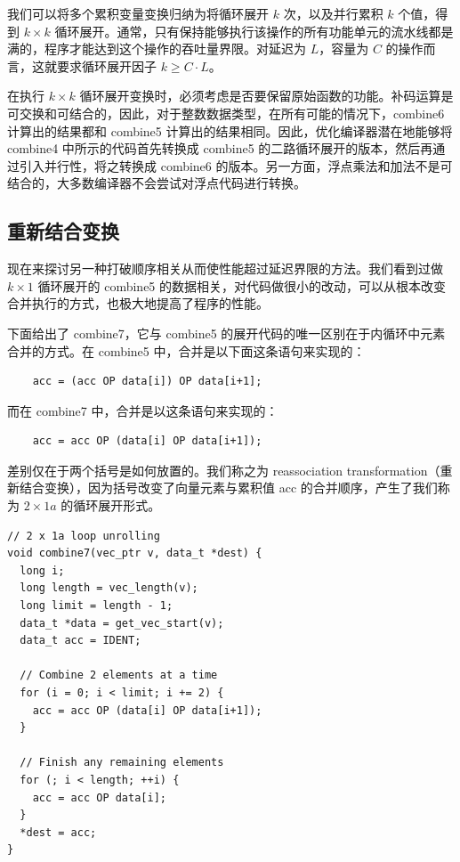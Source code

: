 我们可以将多个累积变量变换归纳为将循环展开 $k$ 次，以及并行累积 $k$ 个值，得到 $k \times k$ 循环展开。通常，只有保持能够执行该操作的所有功能单元的流水线都是满的，程序才能达到这个操作的吞吐量界限。对延迟为 $L$，容量为 $C$ 的操作而言，这就要求循环展开因子 $k \geq C \cdot L$。

在执行 $k \times k$ 循环展开变换时，必须考虑是否要保留原始函数的功能。补码运算是可交换和可结合的，因此，对于整数数据类型，在所有可能的情况下，combine6 计算出的结果都和 combine5 计算出的结果相同。因此，优化编译器潜在地能够将 combine4 中所示的代码首先转换成 combine5 的二路循环展开的版本，然后再通过引入并行性，将之转换成 combine6 的版本。另一方面，浮点乘法和加法不是可结合的，大多数编译器不会尝试对浮点代码进行转换。

\subsection{重新结合变换}

现在来探讨另一种打破顺序相关从而使性能超过延迟界限的方法。我们看到过做 $k \times 1$ 循环展开的 combine5 的数据相关，对代码做很小的改动，可以从根本改变合并执行的方式，也极大地提高了程序的性能。

下面给出了 combine7，它与 combine5 的展开代码的唯一区别在于内循环中元素合并的方式。在 combine5 中，合并是以下面这条语句来实现的：
\begin{verbatim}
    acc = (acc OP data[i]) OP data[i+1];
\end{verbatim}
而在 combine7 中，合并是以这条语句来实现的：
\begin{verbatim}
    acc = acc OP (data[i] OP data[i+1]);
\end{verbatim}
差别仅在于两个括号是如何放置的。我们称之为 reassociation transformation（重新结合变换），因为括号改变了向量元素与累积值 acc 的合并顺序，产生了我们称为 $2 \times 1a$ 的循环展开形式。

\begin{verbatim}
// 2 x 1a loop unrolling
void combine7(vec_ptr v, data_t *dest) {
  long i;
  long length = vec_length(v);
  long limit = length - 1;
  data_t *data = get_vec_start(v);
  data_t acc = IDENT;

  // Combine 2 elements at a time
  for (i = 0; i < limit; i += 2) {
    acc = acc OP (data[i] OP data[i+1]);
  }

  // Finish any remaining elements
  for (; i < length; ++i) {
    acc = acc OP data[i];
  }
  *dest = acc;
}
\end{verbatim}

